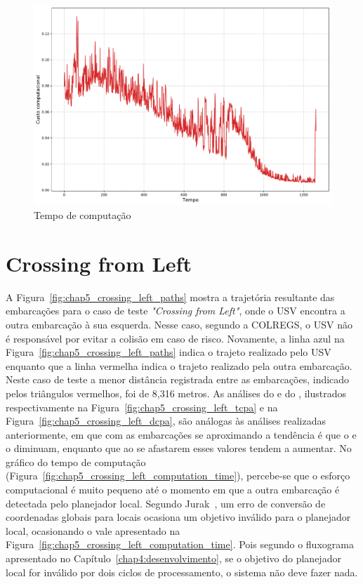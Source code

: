         \begin{figure}[H]
            \centering
            \includegraphics[width=\textwidth]{fig/chap5/overtake_computation_time.pdf}
            \caption{Tempo de computação}
            \label{fig:chap5_overtake_computation_time}
        \end{figure}
        
    \section{Crossing from Left} \label{subchap5_crossing_from_left}
        A Figura~\ref{fig:chap5_crossing_left_paths} mostra a trajetória resultante das embarcações para o caso de teste \textit{"Crossing from Left"}, onde o USV encontra a outra embarcação à sua esquerda. Nesse caso, segundo a COLREGS, o USV não é responsável por evitar a colisão em caso de risco. Novamente, a linha azul na Figura~\ref{fig:chap5_crossing_left_paths} indica o trajeto realizado pelo USV enquanto que a linha vermelha indica o trajeto realizado pela outra embarcação. Neste caso de teste a menor distância registrada entre as embarcações, indicado pelos triângulos vermelhos, foi de 8,316 metros. As análises do \tcpa e do \dcpa, ilustrados respectivamente na 
        Figura~\ref{fig:chap5_crossing_left_tcpa} e na Figura~\ref{fig:chap5_crossing_left_dcpa}, são análogas às análises realizadas anteriormente, em que com as embarcações se aproximando a tendência é que o \tcpa e o \dcpa diminuam, enquanto que ao se afastarem esses valores tendem a aumentar. No gráfico do tempo de computação (Figura~\ref{fig:chap5_crossing_left_computation_time}), percebe-se que o esforço computacional é muito pequeno até o momento em que a outra embarcação é detectada pelo planejador local. Segundo Jurak~\cite{Jurak2020COLREGS}, um erro de conversão de coordenadas globais para locais ocasiona um objetivo inválido para o planejador local, ocasionando o vale apresentado na Figura~\ref{fig:chap5_crossing_left_computation_time}. Pois segundo o fluxograma apresentado no 
        Capítulo~\ref{chap4:desenvolvimento}, se o objetivo do planejador local for inválido por dois ciclos de processamento, o sistema não deve fazer nada.
    
